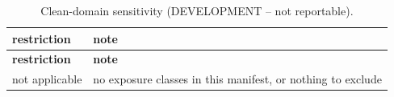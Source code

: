 \begingroup\footnotesize
\begin{longtable}{>{\raggedright\arraybackslash}p{126.4pt}>{\raggedright\arraybackslash}p{304.6pt}}
\caption{Clean-domain sensitivity (DEVELOPMENT -- not reportable).} \\
\toprule
\textbf{restriction} & \textbf{note} \\
\midrule
\endfirsthead
\toprule
\textbf{restriction} & \textbf{note} \\
\midrule
\endhead
\bottomrule
\endfoot
not applicable & no exposure classes in this manifest, or nothing to exclude \\
\end{longtable}
\endgroup
